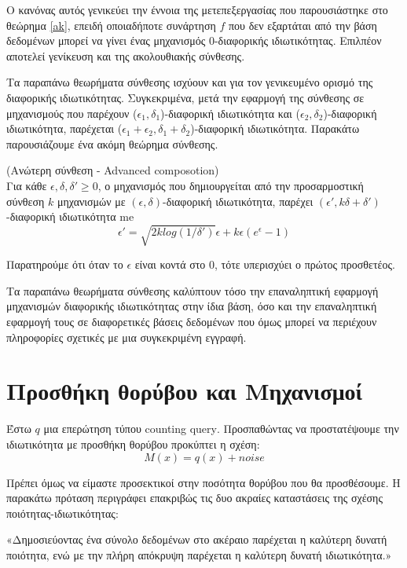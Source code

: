 Ο κανόνας αυτός γενικεύει την έννοια της μετεπεξεργασίας που παρουσιάστηκε στο θεώρημα \ref{ak}, επειδή οποιαδήποτε συνάρτηση $f$ που δεν εξαρτάται από την βάση δεδομένων μπορεί να γίνει ένας μηχανισμός 0-διαφορικής ιδιωτικότητας. Επιλπέον αποτελεί γενίκευση και της ακολουθιακής σύνθεσης.

Τα παραπάνω θεωρήματα σύνθεσης ισχύουν και για τον γενικευμένο ορισμό της διαφορικής ιδιωτικότητας. Συγκεκριμένα, μετά την εφαρμογή της σύνθεσης σε μηχανισμούς που παρέχουν ($\epsilon_1, \delta_1$)-διαφορική ιδιωτικότητα και ($\epsilon_2, \delta_2$)-διαφορική ιδιωτικότητα, παρέχεται ($\epsilon_1+\epsilon_2, \delta_1+\delta_2$)-διαφορική ιδιωτικότητα. Παρακάτω παρουσιάζουμε ένα ακόμη θεώρημα σύνθεσης.

\begin{theorem} (Ανώτερη σύνθεση - \textlatin{Advanced composotion})\\
 Για κάθε $\epsilon, \delta, \delta'\geq 0$, ο μηχανισμός που δημιουργείται από την προσαρμοστική σύνθεση $k$ μηχανισμών με $(\epsilon, \delta)$-διαφορική ιδιωτικότητα, παρέχει $(\epsilon', k\delta+\delta')$-διαφορική ιδιωτικότητα me
 $$\epsilon'=\sqrt{2klog(1/\delta')} \epsilon+k\epsilon(e^\epsilon-1)$$
\end{theorem}
 Παρατηρούμε ότι όταν το $\epsilon$ είναι κοντά στο 0, τότε υπερισχύει ο πρώτος προσθετέος. 

Τα παραπάνω θεωρήματα σύνθεσης καλύπτουν τόσο την επαναληπτική εφαρμογή μηχανισμών διαφορικής ιδιωτικότητας στην ίδια βάση, όσο και την επαναληπτική εφαρμογή τους σε διαφορετικές βάσεις δεδομένων που όμως μπορεί να περιέχουν πληροφορίες σχετικές με μια συγκεκριμένη εγγραφή.









\clearpage
\section{Προσθήκη θορύβου και Μηχανισμοί}


Έστω $q$ μια επερώτηση τύπου \textlatin{counting query}. Προσπαθώντας να προστατέψουμε την ιδιωτικότητα με προσθήκη θορύβου προκύπτει η σχέση: 
$$M(x)=q(x)+noise$$

Πρέπει όμως να είμαστε προσεκτικοί στην ποσότητα θορύβου που θα προσθέσουμε. Η παρακάτω πρόταση περιγράφει επακριβώς τις δυο ακραίες καταστάσεις της σχέσης ποιότητας-ιδιωτικότητας: 

«Δημοσιεύοντας ένα σύνολο δεδομένων στο ακέραιο παρέχεται η καλύτερη δυνατή ποιότητα, ενώ με την πλήρη απόκρυψη παρέχεται η καλύτερη δυνατή ιδιωτικότητα.»

